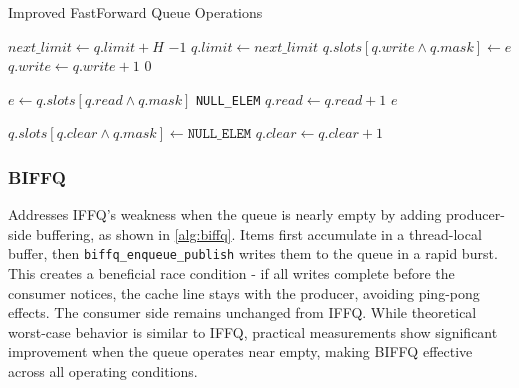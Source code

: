 \begin{algorithm}[!ht]
   \centering
   \captionsetup{justification=centering}
   \caption{Improved FastForward Queue Operations\cite{MaffioneCacheAware}}
   \label{alg:iffq}
   \scriptsize
   \begin{algorithmic}[1]
            
               \State $next\_limit \gets q.limit + H$
                   \State \Return $-1$ 
               \EndIf
               \State $q.limit \gets next\_limit$ 
           \EndIf
           \State $q.slots[q.write \land q.mask] \gets e$
           \State $q.write \gets q.write + 1$
           \State \Return $0$
       \EndFunction
       
       \State
       
           \State $e \gets q.slots[q.read \land q.mask]$
               \State \Return \texttt{NULL\_ELEM}
           \EndIf
           \State $q.read \gets q.read + 1$
           \State \Return $e$
       \EndFunction
       
       \State
       
               \State $q.slots[q.clear \land q.mask] \gets \texttt{NULL\_ELEM}$
               \State $q.clear \gets q.clear + 1$
           \EndWhile
       \EndFunction
   \end{algorithmic}
\end{algorithm}

\subsubsection{\acf{BIFFQ}}
Addresses IFFQ's weakness when the queue is nearly empty by adding producer-side buffering, as shown in \cref{alg:biffq}. Items first accumulate in a thread-local buffer, then \newline \texttt{biffq\_enqueue\_publish} writes them to the queue in a rapid burst. This creates a beneficial race condition - if all writes complete before the consumer notices, the cache line stays with the producer, avoiding ping-pong effects. The consumer side remains unchanged from IFFQ. While theoretical worst-case behavior is similar to IFFQ, practical measurements show significant improvement when the queue operates near empty, making BIFFQ effective across all operating conditions. \cite{MaffioneCacheAware}

